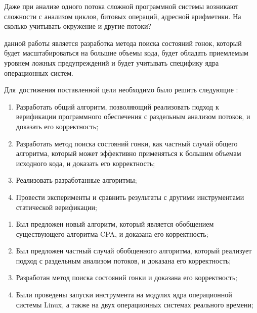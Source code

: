 Даже при анализе одного потока сложной программной системы возникают сложности с анализом циклов, битовых операций, адресной арифметики. 
На сколько учитывать окружение и другие потоки?
\fi


{\aim} данной работы является разработка метода поиска состояний гонок, который будет масштабироваться на большие объемы кода, будет обладать приемлемым уровнем ложных предупреждений и будет учитывать специфику ядра операционных систем.

Для~достижения поставленной цели необходимо было решить следующие {\tasks}:
\begin{enumerate}
  \item Разработать общий алгоритм, позволяющий реализовать подход к верификации программного обеспечения с раздельным анализом потоков, и доказать его корректность;
  \item Разработать метод поиска состояний гонки, как частный случай общего алгоритма, который может эффективно применяться к большим объемам исходного кода, и доказать его корректность;
  \item Реализовать разработанные алгоритмы;
  \item Провести эксперименты и сравнить результаты с другими инструментами статической верификации;
\end{enumerate}

{\novelty}
\begin{enumerate}
  \item Был предложен новый алгоритм, который является обобщением существующего алгоритма CPA, и доказана его корректность;
  \item Был предложен частный случай обобщенного алгоритма, который реализует подход с раздельным анализом потоков, и доказана его корректность;
  \item Разработан метод поиска состояний гонки и доказана его корректность;
  \item Были проведены запуски инструмента на модулях ядра операционной системы Linux, а также на двух операционных системах реального времени;
\end{enumerate}



